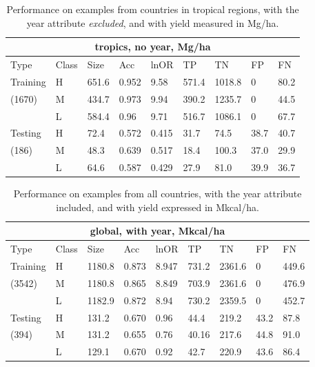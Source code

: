 \documentclass[11pt]{article}
\begin{document}
\begin{table}[h!]
\centering
\begin{tabular}{lllllllll}
\toprule
\multicolumn{9}{c}{\textbf{tropics, no year, Mg/ha}} \\
\midrule
Type & Class & Size & Acc & lnOR & TP & TN & FP & FN \\
\midrule
Training & H & 651.6 & 0.952 & 9.58 & 571.4 & 1018.8 & 0 & 80.2  \\
(1670) & M & 434.7 & 0.973 & 9.94 & 390.2 & 1235.7 & 0 & 44.5  \\
& L & 584.4 & 0.96 & 9.71 & 516.7 & 1086.1 & 0 & 67.7  \\
Testing & H & 72.4 & 0.572 & 0.415 & 31.7 & 74.5 & 38.7 & 40.7  \\
(186) & M & 48.3 & 0.639 & 0.517 & 18.4 & 100.3 & 37.0 & 29.9  \\
& L & 64.6 & 0.587 & 0.429 & 27.9 & 81.0 & 39.9 & 36.7  \\
\bottomrule
\end{tabular}
\caption{Performance on examples from countries in tropical regions, with the year attribute \emph{excluded}, and with yield measured in Mg/ha.}
\label{t.ny.trop_results}
\end{table}

\begin{table}[h!]
\centering
\begin{tabular}{lllllllll}
\toprule
\multicolumn{9}{c}{\textbf{global, with year, Mkcal/ha}} \\
\midrule
Type & Class & Size & Acc & lnOR & TP & TN & FP & FN \\
\midrule
Training & H & 1180.8 & 0.873 & 8.947 & 731.2 & 2361.6 & 0 & 449.6  \\
(3542) & M & 1180.8 & 0.865 & 8.849 & 703.9 & 2361.6 & 0 & 476.9  \\
& L & 1182.9 & 0.872 & 8.94 & 730.2 & 2359.5 & 0 & 452.7  \\
Testing & H & 131.2 & 0.670 & 0.96 & 44.4 & 219.2 & 43.2 & 87.8  \\
(394) & M & 131.2 & 0.655 & 0.76 & 40.16 & 217.6 & 44.8 & 91.0  \\
& L & 129.1 & 0.670 & 0.92 & 42.7 & 220.9 & 43.6 & 86.4  \\
\bottomrule
\end{tabular}
\caption{Performance on examples from all countries, with the year attribute included, and with yield expressed in Mkcal/ha.}
\label{k.wy.wt_results}
\end{table}
\end{document}
